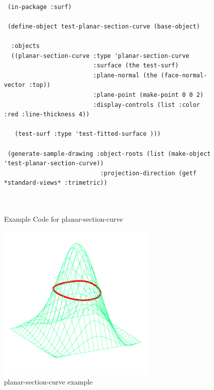 \documentclass [11pt]{book}
\begin{document}
\begin{itemize}
\begin{figure}
\begin{lrbox}{\boxedverb}
\begin{minipage}{\linewidth}
{\begin{verbatim}

 (in-package :surf)

 (define-object test-planar-section-curve (base-object)
  
  :objects
  ((planar-section-curve :type 'planar-section-curve
                         :surface (the test-surf)
                         :plane-normal (the (face-normal-vector :top))
                         :plane-point (make-point 0 0 2)
                         :display-controls (list :color :red :line-thickness 4))
   
   (test-surf :type 'test-fitted-surface )))

 (generate-sample-drawing :object-roots (list (make-object 'test-planar-section-curve))
                           :projection-direction (getf *standard-views* :trimetric))

 
\end{verbatim}}
\end{minipage}
\end{lrbox}
\fbox{\usebox{\boxedverb}}

\caption{Example Code for planar-section-curve}

\label{fig:example-code-planar-section-curve}

\end{figure}

\begin{figure}
\begin{center}
\includegraphics[width=3in,height=3in]{../images/example-planar-section-curve.pdf}
\end{center}

\caption{planar-section-curve example}

\label{fig:planar-section-curve}

\end{figure}






\end{itemize}
\end{document}
